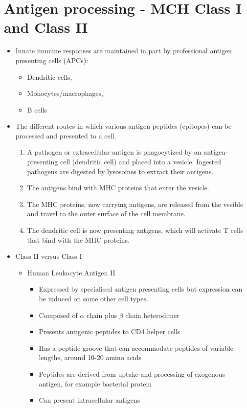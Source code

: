 \documentclass[a4paper, 12pt]{article}
\begin{document}
\section{Antigen processing - MCH Class I and Class II}
\begin{itemize}
\item{Innate immune responses are maintained in part by professional antigen presenting cells (APCs):}
\begin{itemize}
\item{Dendritic cells,}
\item{Monocytes/macrophages,}
\item{B cells}
\end{itemize}
\item{The different routes in which various antigen peptides (epitopes) can be processed and presented to a cell.}
\begin{enumerate}
\item{A pathogen or extracellular antigen is phagocytized by an antigen-presenting cell (dendritic cell) and placed into a vesicle. Ingested pathogens are digested by lysosomes to extract their antigens.}
\item{The antigens bind with MHC proteins that enter the vesicle.}
\item{The MHC proteins, now carrying antigens, are released from the vesible and travel to the outer surface of the cell membrane.}
\item{The dendritic cell is now presenting antigens, which will activate T cells that bind with the MHC proteins.}
\end{enumerate}
\item{Class II versus Class I}
\begin{itemize}
\item{Human Leukocyte Antigen II}
\begin{itemize}
\item{Expressed by specialised antigen presenting cells but expression can be induced on some other cell types.}
\item{Composed of $\alpha$ chain plus $\beta$ chain heterodimer}
\item{Presents antigenic peptides to CD4 helper cells}
\item{Has a peptide groove that can accommodate peptides of variable lengths, around 10-20 amino acids}
\item{Peptides are derived from uptake and processing of exogenous antigen, for example bacterial protein}
\item{Can present intracellular antigens}
\end{itemize}


\end{itemize}
\end{itemize}
\end{document}
